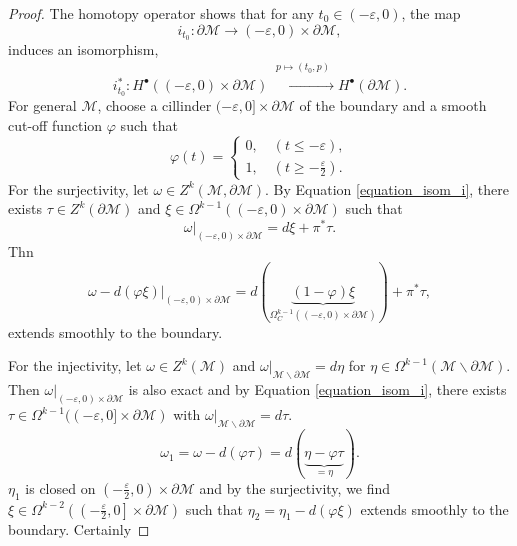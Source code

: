 \documentclass[10pt]{article}
\newcommand{\M}[0]{\mathcal{M}}
\begin{document}
\begin{proof}
  The homotopy operator shows that for any $t_0\in(-\varepsilon,0)$, the map 
  \begin{equation*}
    i_{t_0}:\partial\M\to(-\varepsilon,0)\times\partial\M,
  \end{equation*}
  induces an isomorphism,
  \begin{equation*}
    i_{t_0}^*:H^\bullet((-\varepsilon,0)\times\partial\M)\stackrel{\substack{p\mapsto(t_0,p)\\\:}}{\to}H^\bullet(\partial\M).\tag{$\ast$}\label{equation_isom_i}
  \end{equation*}
  For general $\M$, choose a cillinder $(-\varepsilon,0]\times\partial\M$ of the boundary and a smooth cut-off function $\varphi$ such that 
  \begin{equation*}
    \varphi(t)=\begin{cases}
      0,\quad(t\leq-\varepsilon),\\
      1,\quad(t\geq-{\frac \varepsilon 2}).
    \end{cases}
  \end{equation*}
  For the surjectivity, let $\omega\in Z^k(\M,\partial\M)$. By Equation \eqref{equation_isom_i}, there exists $\tau\in Z^k(\partial\M)$ and $\xi\in\Omega^{k-1}((-\varepsilon,0)\times\partial\M)$ such that 
  \begin{equation*}
    \omega|_{(-\varepsilon,0)\times\partial\M}=d\xi+\pi^*\tau.
  \end{equation*}
  Thn 
  \begin{equation*}
    \omega-d(\varphi\xi)|_{(-\varepsilon,0)\times\partial\M} = d(\underbrace{(1-\varphi)\xi}_{\Omega^{k-1}_C((-\varepsilon,0)\times\partial\M)})+\pi^*\tau,
  \end{equation*}
  extends smoothly to the boundary.
  \par For the injectivity, let $\omega\in Z^k(\M)$ and $\omega|_{\M\backslash\partial\M}=d\eta$ for $\eta\in\Omega^{k-1}(\M\backslash\partial\M)$. Then $\omega|_{(-\varepsilon,0)\times\partial\M}$ is also exact and by Equation \eqref{equation_isom_i}, there exists $\tau\in\Omega^{k-1}((-\varepsilon,0]\times\partial\M)$ with $\omega|_{\M\backslash\partial\M}=d\tau$.
  \begin{equation*}
    \omega_1 = \omega-d(\varphi\tau) = d(\underbrace{\eta-\varphi\tau}_{=\eta}).
  \end{equation*}
  $\eta_1$ is closed on $\left(-{\frac \varepsilon 2},0\right)\times\partial\M$ and by the surjectivity, we find $\xi\in\Omega^{k-2}\left(\left(-{\frac \varepsilon 2},0\right]\times\partial\M\right)$ such that $\eta_2 = \eta_1-d(\varphi\xi)$ extends smoothly to the boundary. Certainly 

\end{proof}
\end{document}
